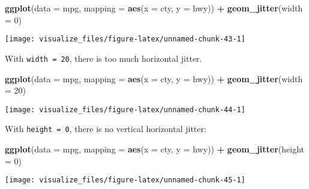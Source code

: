 \documentclass[]{book}
\newenvironment{Shaded}{\begin{snugshade}}{\end{snugshade}}
\newcommand{\DataTypeTok}[1]{\textcolor[rgb]{0.13,0.29,0.53}{#1}}
\newcommand{\DecValTok}[1]{\textcolor[rgb]{0.00,0.00,0.81}{#1}}
\newcommand{\KeywordTok}[1]{\textcolor[rgb]{0.13,0.29,0.53}{\textbf{#1}}}
\newcommand{\NormalTok}[1]{#1}
\newcommand{\OperatorTok}[1]{\textcolor[rgb]{0.81,0.36,0.00}{\textbf{#1}}}
\newcommand{\StringTok}[1]{\textcolor[rgb]{0.31,0.60,0.02}{#1}}
\theoremstyle{plain}
\theoremstyle{remark}
\begin{document}
\begin{Shaded}
\begin{Highlighting}[]
\KeywordTok{ggplot}\NormalTok{(}\DataTypeTok{data =}\NormalTok{ mpg, }\DataTypeTok{mapping =} \KeywordTok{aes}\NormalTok{(}\DataTypeTok{x =}\NormalTok{ cty, }\DataTypeTok{y =}\NormalTok{ hwy)) }\OperatorTok{+}
\StringTok{  }\KeywordTok{geom_jitter}\NormalTok{(}\DataTypeTok{width =} \DecValTok{0}\NormalTok{)}
\end{Highlighting}
\end{Shaded}

\begin{center}\texttt{[image: visualize\_files/figure-latex/unnamed-chunk-43-1]} \end{center}

With \texttt{width\ =\ 20}, there is too much horizontal jitter.

\begin{Shaded}
\begin{Highlighting}[]
\KeywordTok{ggplot}\NormalTok{(}\DataTypeTok{data =}\NormalTok{ mpg, }\DataTypeTok{mapping =} \KeywordTok{aes}\NormalTok{(}\DataTypeTok{x =}\NormalTok{ cty, }\DataTypeTok{y =}\NormalTok{ hwy)) }\OperatorTok{+}
\StringTok{  }\KeywordTok{geom_jitter}\NormalTok{(}\DataTypeTok{width =} \DecValTok{20}\NormalTok{)}
\end{Highlighting}
\end{Shaded}

\begin{center}\texttt{[image: visualize\_files/figure-latex/unnamed-chunk-44-1]} \end{center}

With \texttt{height\ =\ 0}, there is no vertical horizontal jitter:

\begin{Shaded}
\begin{Highlighting}[]
\KeywordTok{ggplot}\NormalTok{(}\DataTypeTok{data =}\NormalTok{ mpg, }\DataTypeTok{mapping =} \KeywordTok{aes}\NormalTok{(}\DataTypeTok{x =}\NormalTok{ cty, }\DataTypeTok{y =}\NormalTok{ hwy)) }\OperatorTok{+}
\StringTok{  }\KeywordTok{geom_jitter}\NormalTok{(}\DataTypeTok{height =} \DecValTok{0}\NormalTok{)}
\end{Highlighting}
\end{Shaded}

\begin{center}\texttt{[image: visualize\_files/figure-latex/unnamed-chunk-45-1]} \end{center}
\end{document}
